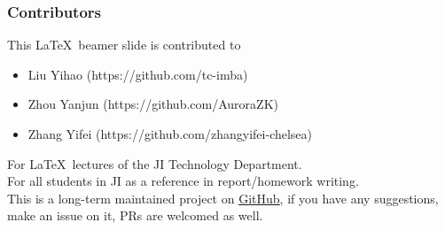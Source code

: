 \documentclass{beamer}
\begin{document}
\begin{frame}
	\frametitle{Contributors}
	This \LaTeX\ beamer slide is contributed to
	\begin{itemize}
	\item Liu Yihao (https://github.com/tc-imba)\\
	\item Zhou Yanjun (https://github.com/AuroraZK)\\
	\item Zhang Yifei (https://github.com/zhangyifei-chelsea)
	\end{itemize}	
	For \LaTeX\ lectures of the JI Technology Department.\\
	For all students in JI as a reference in report/homework writing.\\[0.5em]
	
	This is a long-term maintained project on \href{https://github.com/SJTU-UMJI-Tech/LaTeX}{\color{blue}\underline{GitHub}}, if you have any suggestions, make an issue on it, PRs are welcomed as well.
	
\end{frame}
\end{document}
